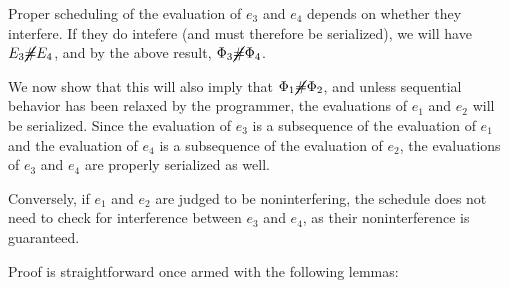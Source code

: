 Proper scheduling of the evaluation of $e_3$ and $e_4$ depends on whether
they interfere.  If they do intefere (and must therefore be serialized), we
will have $E_3 \cancel\# E_4$, and by the above result, $\Phi_3 \cancel\# \Phi_4$. 

We now show that this will also imply that $\Phi_1 \cancel\# \Phi_2$, and
unless sequential behavior has been relaxed by the programmer, the
evaluations of $e_1$ and $e_2$ will be serialized.  Since the evaluation of
$e_3$ is a subsequence of the evaluation of $e_1$ and the evaluation of $e_4$
is a subsequence of the evaluation of $e_2$, the evaluations of $e_3$ and $e_4$
are properly serialized as well.

Conversely, if $e_1$ and $e_2$ are judged to be noninterfering, the schedule
does not need to check for interference between $e_3$ and $e_4$, as their
noninterference is guaranteed.

Proof is straightforward once armed with the following lemmas:



